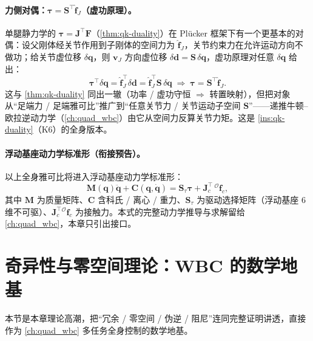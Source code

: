 \paragraph{力侧对偶：$\boldsymbol{\tau}=\mathbf{S}^\top\hat{\boldsymbol{f}}_J$（虚功原理）。}
单腿静力学的 $\boldsymbol{\tau}=\mathbf{J}^\top\mathbf{F}$（\cref{thm:qk-duality}）在 Plücker 框架下有一个更基本的对偶：设父刚体经关节作用到子刚体的空间力为 $\hat{\boldsymbol{f}}_J$，关节约束力在允许运动方向不做功；给关节虚位移 $\delta\boldsymbol{q}$，则 $\boldsymbol{v}_J$ 方向虚位移 $\delta\boldsymbol{d}=\mathbf{S}\,\delta\boldsymbol{q}$，虚功原理对任意 $\delta\boldsymbol{q}$ 给出\cite{yu2021quadruped}：
\begin{equation}
  \boldsymbol{\tau}^\top\delta\boldsymbol{q}=\hat{\boldsymbol{f}}_J^\top\delta\boldsymbol{d}=\hat{\boldsymbol{f}}_J^\top\mathbf{S}\,\delta\boldsymbol{q}
  \;\Longrightarrow\;
  \boldsymbol{\tau}=\mathbf{S}^\top\hat{\boldsymbol{f}}_J.
  \label{eq:qk-virtual-work}
\end{equation}
这与 \cref{thm:qk-duality} 同出一辙（功率 / 虚功守恒 $\Rightarrow$ 转置映射），但把对象从“足端力 / 足端雅可比”推广到“任意关节力 / 关节运动子空间 $\mathbf{S}$”——递推牛顿--欧拉逆动力学（\cref{ch:quad_wbc}）由它从空间力反算关节力矩。这是 \cref{ins:qk-duality}（K6）的全身版本。

\paragraph{浮动基座动力学标准形（衔接预告）。}
以上全身雅可比将进入浮动基座动力学标准形\cite{yu2021quadruped}：
\begin{equation}
  \mathbf{M}(\boldsymbol{q})\ddot{\boldsymbol{q}}+\mathbf{C}(\boldsymbol{q},\dot{\boldsymbol{q}})=\mathbf{S}_\tau\boldsymbol{\tau}+\mathbf{J}_c^\top\,{}^{\mathcal{O}}\mathbf{f}_c,
  \label{eq:qk-floating-dynamics}
\end{equation}
其中 $\mathbf{M}$ 为质量矩阵、$\mathbf{C}$ 含科氏 / 离心 / 重力、$\mathbf{S}_\tau$ 为驱动选择矩阵（浮动基座 $6$ 维不可驱）、$\mathbf{J}_c^\top{}^{\mathcal{O}}\mathbf{f}_c$ 为接触力。本式的完整动力学推导与求解留给 \cref{ch:quad_wbc}，本章只引出接口。

\section{奇异性与零空间理论：WBC 的数学地基}
\label{sec:qk-nullspace}

本节是本章理论高潮，把“冗余 / 零空间 / 伪逆 / 阻尼”连同完整证明讲透，直接作为 \cref{ch:quad_wbc} 多任务全身控制的数学地基。

